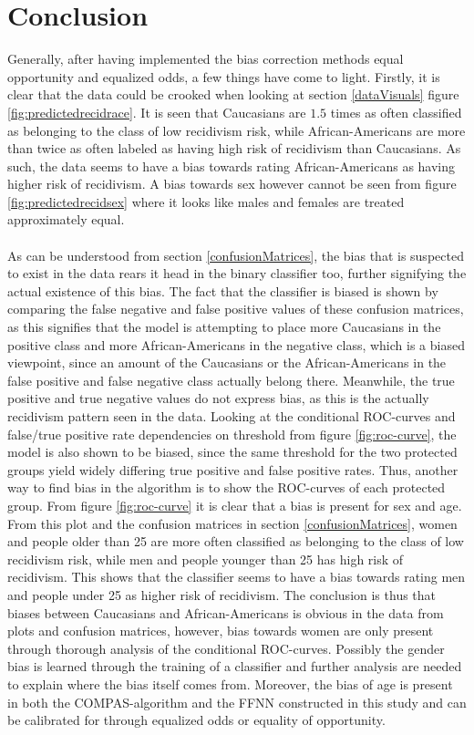 \documentclass[11pt, fleqn, titlepage]{article}
\begin{document}
	\section{Conclusion} \label{conclusion}
	Generally, after having implemented the bias correction methods equal opportunity and equalized odds, a few things have come to light. Firstly, it is clear that the data could be crooked when looking at section \ref{dataVisuals} figure \ref{fig:predictedrecidrace}. It is seen that Caucasians are $ 1.5 $ times as often classified as belonging to the class of low recidivism risk, while African-Americans are more than twice as often labeled as having high risk of recidivism than Caucasians. As such, the data seems to have a bias towards rating African-Americans as having higher risk of recidivism. A bias towards sex however cannot be seen from figure \ref{fig:predictedrecidsex} where it looks like males and females are treated approximately equal. 
	\\\\
	As can be understood from section \ref{confusionMatrices}, the bias that is suspected to exist in the data rears it head in the binary classifier too, further signifying the actual existence of this bias. The fact that the classifier is biased is shown by comparing the false negative and false positive values of these confusion matrices, as this signifies that the model is attempting to place more Caucasians in the positive class and more African-Americans in the negative class, which is a biased viewpoint, since an amount of the Caucasians or the African-Americans in the false positive and false negative class actually belong there. Meanwhile, the true positive and true negative values do not express bias, as this is the actually recidivism pattern seen in the data. Looking at the conditional ROC-curves and false/true positive rate dependencies on threshold from figure \ref{fig:roc-curve}, the model is also shown to be biased, since the same threshold for the two protected groups yield widely differing true positive and false positive rates. Thus, another way to find bias in the algorithm is to show the ROC-curves of each protected group. From figure \ref{fig:roc-curve} it is clear that a bias is present for sex and age. From this plot and the confusion matrices in section \ref{confusionMatrices}, women and people older than 25 are more often classified as belonging to the class of low recidivism risk, while men and people younger than 25 has high risk of recidivism. This shows that the classifier seems to have a bias towards rating men and people under 25 as higher risk of recidivism. The conclusion is thus that biases between Caucasians and African-Americans is obvious in the data from plots and confusion matrices, however, bias towards women are only present through thorough analysis of the conditional ROC-curves. Possibly the gender bias is learned through the training of a classifier and further analysis are needed to explain where the bias itself comes from. Moreover, the bias of age is present in both the COMPAS-algorithm and the FFNN constructed in this study and can be calibrated for through equalized odds or equality of opportunity.
\end{document}
